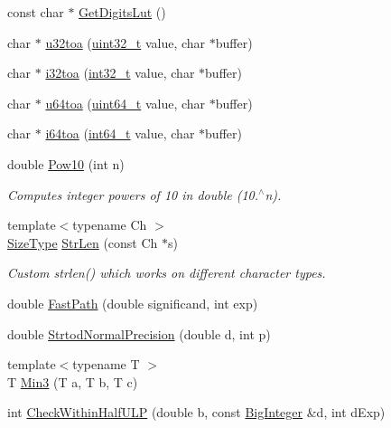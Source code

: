 \begin{DoxyCompactItemize}
\item 
const char $\ast$ \hyperlink{namespaceinternal_a95459e80b3f0e89ad03ebd0c8e55844c}{Get\+Digits\+Lut} ()
\item 
char $\ast$ \hyperlink{namespaceinternal_a8628d3698be60950743bc49d41a1cca7}{u32toa} (\hyperlink{stdint_8h_a435d1572bf3f880d55459d9805097f62}{uint32\+\_\+t} value, char $\ast$buffer)
\item 
char $\ast$ \hyperlink{namespaceinternal_a79bdea0c3f5e0c34c5c0aa686fc823c1}{i32toa} (\hyperlink{stdint_8h_ab1967d8591af1a4e48c37fd2b0f184d0}{int32\+\_\+t} value, char $\ast$buffer)
\item 
char $\ast$ \hyperlink{namespaceinternal_aff16deebb94b3ea88a1dfff7bbc377b0}{u64toa} (\hyperlink{stdint_8h_aec6fcb673ff035718c238c8c9d544c47}{uint64\+\_\+t} value, char $\ast$buffer)
\item 
char $\ast$ \hyperlink{namespaceinternal_a51566359e64c9746656c396c63a23d61}{i64toa} (\hyperlink{stdint_8h_a414156feea104f8f75b4ed9e3121b2f6}{int64\+\_\+t} value, char $\ast$buffer)
\item 
double \hyperlink{namespaceinternal_af01c41d045d596e2f8d1888cf6fbecb6}{Pow10} (int n)
\begin{DoxyCompactList}\small\item\em Computes integer powers of 10 in double (10.$^\wedge$n). \end{DoxyCompactList}\item 
{\footnotesize template$<$typename Ch $>$ }\\\hyperlink{rapidjson_8h_a5ed6e6e67250fadbd041127e6386dcb5}{Size\+Type} \hyperlink{namespaceinternal_a86326fb0c9d7c7ea8edd7deedbb2b26e}{Str\+Len} (const Ch $\ast$s)
\begin{DoxyCompactList}\small\item\em Custom strlen() which works on different character types. \end{DoxyCompactList}\item 
double \hyperlink{namespaceinternal_aa1bb51d788788eb5390a16462b40d98d}{Fast\+Path} (double significand, int exp)
\item 
double \hyperlink{namespaceinternal_a9e5fac4695310f09892fe52b1d24ab19}{Strtod\+Normal\+Precision} (double d, int p)
\item 
{\footnotesize template$<$typename T $>$ }\\T \hyperlink{namespaceinternal_ace304441347098a4953ea99f50805da9}{Min3} (T a, T b, T c)
\item 
int \hyperlink{namespaceinternal_a190f9c286df64526a7e3550528ed6b02}{Check\+Within\+Half\+U\+LP} (double b, const \hyperlink{classinternal_1_1BigInteger}{Big\+Integer} \&d, int d\+Exp)

\end{DoxyCompactItemize}
